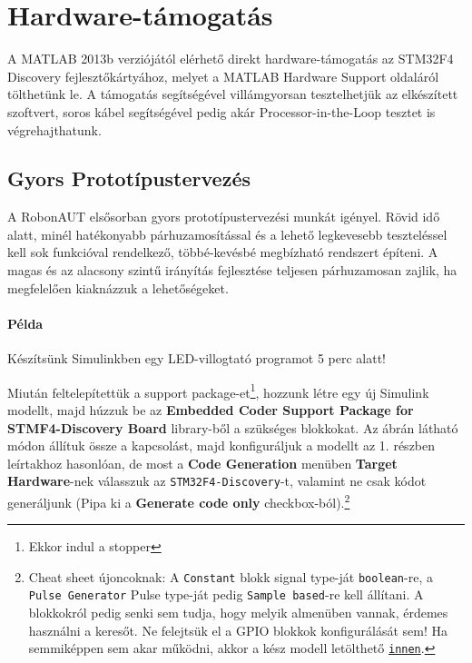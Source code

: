 \section{Hardware-támogatás}

A MATLAB 2013b verziójától elérhető direkt hardware-támogatás az STM32F4 Discovery fejlesztőkártyához, melyet a MATLAB Hardware Support oldaláról tölthetünk le. A támogatás segítségével villámgyorsan tesztelhetjük az elkészített szoftvert, soros kábel segítségével pedig akár Processor-in-the-Loop tesztet is végrehajthatunk\cite[]{pilveri}.

\subsection{Gyors Prototípustervezés}

A RobonAUT elsősorban gyors prototípustervezési munkát igényel. Rövid idő alatt, minél hatékonyabb párhuzamosítással és a lehető legkevesebb teszteléssel kell sok funkcióval rendelkező, többé-kevésbé megbízható rendszert építeni. A magas és az alacsony szintű irányítás fejlesztése teljesen párhuzamosan zajlik, ha megfelelően kiaknázzuk a lehetőségeket.

\paragraph{Példa} Készítsünk Simulinkben egy LED-villogtató programot 5 perc alatt!

Miután feltelepítettük a support package-et\footnote{Ekkor indul a stopper}, hozzunk létre egy új Simulink modellt, majd húzzuk be az \textbf{Embedded Coder Support Package for STMF4-Discovery Board} library-ből a szükséges blokkokat. Az ábrán látható módon állítuk össze a kapcsolást, majd konfiguráljuk a modellt az 1. részben leírtakhoz hasonlóan, de most a \textbf{Code Generation} menüben \textbf{Target Hardware}-nek válasszuk az \verb!STM32F4-Discovery!-t, valamint ne csak kódot generáljunk (Pipa ki a \textbf{Generate code only} checkbox-ból).\footnote{Cheat sheet újoncoknak: A \texttt{Constant} blokk signal type-ját  \texttt{boolean}-re, a  \texttt{Pulse Generator} Pulse type-ját pedig  \texttt{Sample based}-re kell állítani. A blokkokról pedig senki sem tudja, hogy melyik almenüben vannak, érdemes használni a keresőt. Ne felejtsük el a GPIO blokkok konfigurálását sem! Ha semmiképpen sem akar működni, akkor a kész modell letölthető \href{http://www.mathworks.com/matlabcentral/fileexchange/45953-stm32f4-discovery-led-blinker}{\texttt{innen}}.}

